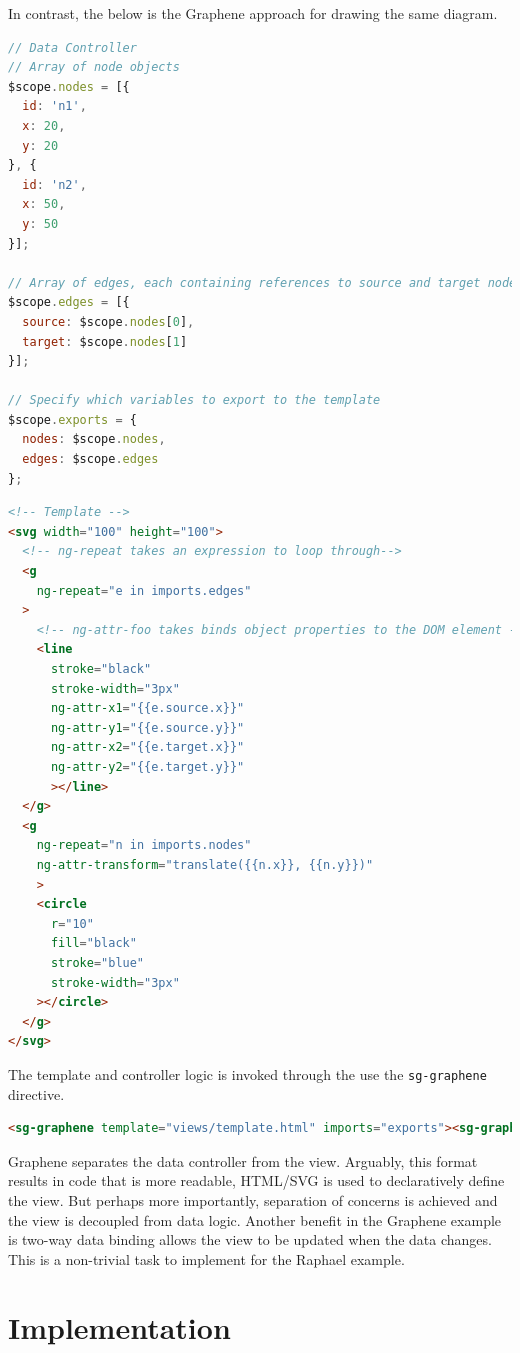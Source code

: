 In contrast, the below is the Graphene approach for drawing the same diagram. \autocite{gu2014grapheneSimple}

\begin{lstlisting}[language=JavaScript]
// Data Controller
// Array of node objects
$scope.nodes = [{
  id: 'n1',
  x: 20,
  y: 20
}, {
  id: 'n2',
  x: 50,
  y: 50
}];

// Array of edges, each containing references to source and target nodes
$scope.edges = [{
  source: $scope.nodes[0],
  target: $scope.nodes[1]
}];

// Specify which variables to export to the template
$scope.exports = {
  nodes: $scope.nodes,
  edges: $scope.edges
};
\end{lstlisting}

\begin{lstlisting}[language=html]
<!-- Template -->
<svg width="100" height="100">
  <!-- ng-repeat takes an expression to loop through-->
  <g
    ng-repeat="e in imports.edges"
  >
    <!-- ng-attr-foo takes binds object properties to the DOM element -->
    <line 
      stroke="black"
      stroke-width="3px"
      ng-attr-x1="{{e.source.x}}"
      ng-attr-y1="{{e.source.y}}"
      ng-attr-x2="{{e.target.x}}"
      ng-attr-y2="{{e.target.y}}"
      ></line>
  </g>
  <g 
    ng-repeat="n in imports.nodes"
    ng-attr-transform="translate({{n.x}}, {{n.y}})"
    >
    <circle
      r="10"
      fill="black"
      stroke="blue"
      stroke-width="3px"
    ></circle>
  </g>
</svg>
\end{lstlisting}

The template and controller logic is invoked through the use the \texttt{sg-graphene} directive.

\begin{lstlisting}[language=html]
<sg-graphene template="views/template.html" imports="exports"><sg-graphene>
\end{lstlisting}

Graphene separates the data controller from the view.
Arguably, this format results in code that is more readable, HTML/SVG is used to declaratively define the view.
But perhaps more importantly, separation of concerns is achieved and the view is decoupled from data logic.
Another benefit in the Graphene example is two-way data binding allows the view to be updated when the data changes.
This is a non-trivial task to implement for the Raphael example.

\section{Implementation}

